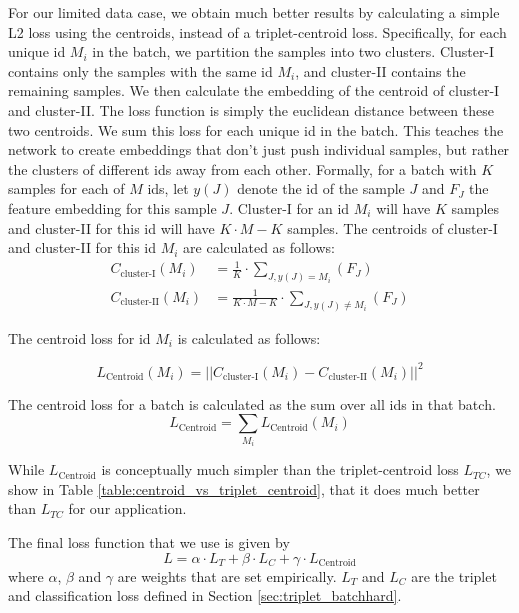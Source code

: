 \documentclass{article}
\begin{document}
For our limited data case, we obtain much better results by calculating a simple L2 loss using the centroids, instead of a triplet-centroid loss. Specifically, for each unique id $M_i$ in the batch, we partition the samples into two clusters. Cluster-I contains only the samples with the same id $M_i$, and cluster-II contains the remaining samples. We then calculate the embedding of the centroid of cluster-I and cluster-II. The loss function is simply the euclidean distance between these two centroids. We sum this loss for each unique id in the batch. This teaches the network to create embeddings that don't just push individual samples, but rather the clusters of different ids away from each other. Formally, for a batch with $K$ samples for each of $M$ ids, let $y(J)$ denote the id of the sample $J$ and $F_{J}$ the feature embedding for this sample $J$. Cluster-I for an id $M_i$ will have $K$ samples and cluster-II for this id will have $K \cdot M - K$ samples. The centroids of cluster-I and cluster-II for this id $M_i$ are calculated as follows:
\begin{align}
    C_{\text{cluster-I}}(M_i) &= \frac{1}{K} \cdot \sum_{J,  y(J) = M_i}(F_{J}) \\
    C_{\text{cluster-II}}(M_i) &= \frac{1}{K \cdot M - K} \cdot \sum_{J, y(J) \neq M_i}(F_{J})
\end{align}

The centroid loss for id $M_i$ is calculated as follows:

\begin{equation}
    L_{\text{Centroid}}(M_i) = ||C_{\text{cluster-I}}(M_i) - C_{\text{cluster-II}}(M_i)||^2
\end{equation}

The centroid loss for a batch is calculated as the sum over all ids in that batch.
\begin{equation}
\label{eq:centroid_loss}
    L_{\text{Centroid}} = \sum_{M_i} L_{\text{Centroid}}(M_i)
\end{equation}

While $L_{\text{Centroid}}$ is conceptually much simpler than the triplet-centroid loss $L_{TC}$, we show in Table \ref{table:centroid_vs_triplet_centroid}, that it does much better than $L_{TC}$ for our application.

The final loss function that we use is given by
\begin{equation}
\label{eq:loss}
    L = \alpha \cdot L_{T} + \beta \cdot L_{C} + \gamma \cdot L_{\text{Centroid}}
\end{equation}
where $\alpha$, $\beta$ and $\gamma$ are weights that are set empirically. $L_{T}$ and $L_{C}$ are the triplet and classification loss defined in Section \ref{sec:triplet_batchhard}.
\end{document}
